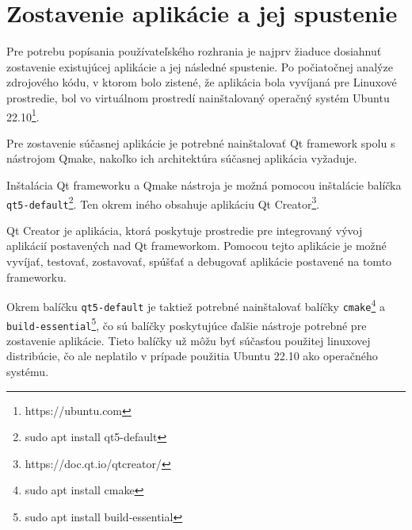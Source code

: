 \section {Zostavenie aplikácie a jej spustenie}
Pre potrebu popísania používateľského rozhrania je najprv žiaduce dosiahnuť zostavenie existujúcej aplikácie a jej následné spustenie. Po počiatočnej analýze zdrojového kódu, v ktorom bolo zistené, že aplikácia bola vyvíjaná pre Linuxové prostredie, bol vo virtuálnom prostredí nainštalovaný operačný systém Ubuntu 22.10\footnote{https://ubuntu.com}.

Pre zostavenie súčasnej aplikácie je potrebné nainštalovať Qt framework spolu s nástrojom Qmake, nakoľko ich architektúra súčasnej aplikácia vyžaduje.

\clearpage

Inštalácia Qt frameworku a Qmake nástroja je možná pomocou inštalácie balíčka \texttt{qt5-default}\footnote{sudo apt install qt5-default}. Ten okrem iného obsahuje aplikáciu Qt Creator\footnote{https://doc.qt.io/qtcreator/}.

Qt Creator je aplikácia, ktorá poskytuje prostredie pre integrovaný vývoj aplikácií postavených nad Qt frameworkom. Pomocou tejto aplikácie je možné vyvíjať, testovať, zostavovať, spúšťať a debugovať aplikácie postavené na tomto frameworku.

Okrem balíčku \texttt{qt5-default} je taktiež potrebné nainštalovať balíčky \texttt{cmake}\footnote{sudo apt install cmake} a \texttt{build-essential}\footnote{sudo apt install build-essential}, čo sú balíčky poskytujúce ďalšie nástroje potrebné pre zostavenie aplikácie. Tieto balíčky už môžu byť súčasťou použitej linuxovej distribúcie, čo ale neplatilo v prípade použitia Ubuntu 22.10 ako operačného systému.

